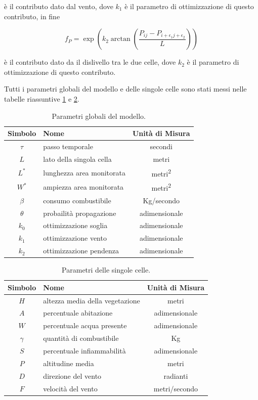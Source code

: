\documentclass{article}
\newcommand{\e}{\epsilon}
\newcommand{\combvar}{Kg} %
\begin{document}
è il contributo dato dal vento, dove $k_1$ è il parametro di ottimizzazione di
questo contributo, in fine

\begin{equation}\label{eq:slope}
f_P = \exp\left(k_2\arctan\left(\frac{P_{ij}-P_{i+\e_1j+\e_2}}{L}\right)\right)
\end{equation}

è il contributo dato da il dislivello tra le due celle, dove $k_2$ è il
parametro di ottimizzazione di questo contributo.

Tutti i parametri globali del modello e delle singole celle sono stati messi
nelle tabelle riassuntive \ref{tab:globals} e \ref{tab:params}.

\begin{table}
\centering
\begin{tabular}{|c|l|c|}
	\hline
	\textbf{Simbolo} & \textbf{Nome} & \textbf{Unità di Misura}\\
	\hline
	$\tau$ & passo temporale & secondi\\
	$L$ & lato della singola cella & metri\\
	$L^*$ & lunghezza area monitorata & metri\textsuperscript{2}\\
	$W^*$ & ampiezza area monitorata & metri\textsuperscript{2}\\
	$\beta$ & consumo combustibile & \combvar/secondo\\
	$\theta$ & probailità propagazione & adimensionale\\
	$k_0$ & ottimizzazione soglia & adimensionale\\
	$k_1$ & ottimizzazione vento & adimensionale\\
	$k_2$ & ottimizzazione pendenza & adimensionale\\
	\hline
\end{tabular}
\caption{Parametri globali del modello.}
\label{tab:globals}
\end{table}

\begin{table}
\centering
\begin{tabular}{|c|l|c|}
	\hline
	\textbf{Simbolo} & \textbf{Nome} & \textbf{Unità di Misura}\\
	\hline
	$H$ & altezza media della vegetazione & metri\\
	$A$ & percentuale abitazione & adimensionale\\
	$W$ & percentuale acqua presente & adimensionale\\
	$\gamma$ & quantità di combustibile & \combvar\\
	$S$ & percentuale infiammabilità & adimensionale\\
	$P$ & altitudine media & metri\\
	$D$ & direzione del vento & radianti\\
	$F$ & velocità del vento & metri/secondo\\
	\hline
\end{tabular}
\caption{Parametri delle singole celle.}
\label{tab:params}
\end{table}
\end{document}
